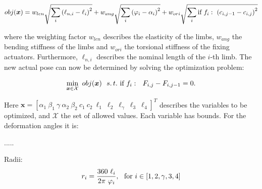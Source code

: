 \documentclass[10pt,a4paper]{article}
\begin{document}
\begin{equation}
obj(\bm{x}) = w_{len}\sqrt{\sum_i \left( \ell_{n,i} - \ell_i \right)^2} 
+ w_{ang} \sqrt{\sum_i \left( \varphi_i - \alpha_i \right)^2}
+ w_{ori} \sqrt{\sum_i \textnormal{if}~f_i:~\left( c_{i,j-1} - c_{i, j} \right)^2}
\label{eq:objective_function}
\end{equation}

where the weighting factor $w_{len}$ describes the elasticity of the limbs, $w_{ang}$ the bending stiffness of the limbs and $w_{ori}$ the torsional stiffness of the fixing actuators.
Furthermore, $\ell_{n,i}$ describes the nominal length of the $i$-th limb.
The new actual pose can now be determined by solving the optimization problem:

\begin{equation}
\min_{\bm{x} \in \mathcal{X}} ~ obj(\bm{x})~~ s.\,t.~ \textnormal{if}~f_i:~~F_{i,j} - F_{i,j-1} = 0.
\end{equation}


Here $\bm{x} = \left[ \alpha_1 ~ \beta_1 ~ \gamma ~ \alpha_2 ~ \beta_2 ~ c_1 ~ c_2 ~ \ell_1 ~ \ell_2 ~ \ell_\gamma ~ \ell_3 ~ \ell_4 \right]^T$ describes the variables to be optimized, and $\mathcal{X}$ the set of allowed values.
Each variable has bounds. 
For the deformation angles it is:

.....

Radii:
\begin{equation}
r_i = \frac{360 ~ \ell_i}{2 \pi ~ \varphi_i},~~ \textnormal{for}~ i \in [1,2,\gamma,3,4]
\end{equation}
\end{document}
